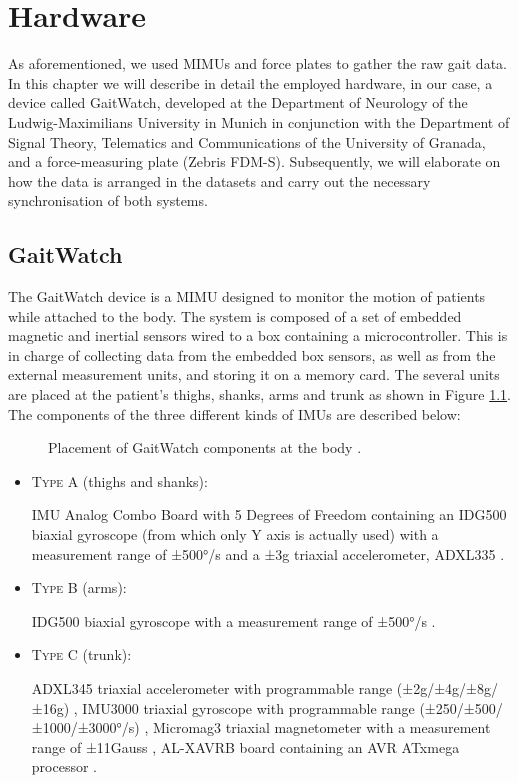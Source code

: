 \chapter{Hardware}
\label{ch:Hardware}

As aforementioned, we used MIMUs and force plates to gather the raw gait data. In this chapter we will describe in detail the employed hardware, in our case, a device called GaitWatch, developed at the Department of Neurology of the Ludwig-Maximilians University in Munich in conjunction with the Department of Signal Theory, Telematics and Communications of the University of Granada, and a force-measuring plate (Zebris FDM-S). Subsequently, we will elaborate on how the data is arranged in the datasets and carry out the necessary synchronisation of both systems.

\section{GaitWatch}

The GaitWatch device is a MIMU designed to monitor the motion of patients while attached to the body. The system is composed of a set of embedded magnetic and inertial sensors wired to a box containing a microcontroller. This is in charge of collecting data from the embedded box sensors, as well as from the external measurement units, and storing it on a memory card. The several units are placed at the patient's thighs, shanks, arms and trunk as shown in Figure \ref{fig:GaitWatch_placement}. The components of the three different kinds of IMUs are described below:

\begin{figure}
	\centering
	\caption{Placement of GaitWatch components at the body \cite{olivares_vicente_gaitwatch_2013}.}
	\label{fig:GaitWatch_placement}
\end{figure}

\begin{itemize}

\item \textsc{Type A} (thighs and shanks): 

IMU Analog Combo Board with 5 Degrees of Freedom \cite{IMU5} containing an IDG500 biaxial gyroscope (from which only Y axis is actually used) with a measurement range of ±500°/s \cite{IDG500} and a ±3g triaxial accelerometer, ADXL335 \cite{ADXL335}.

\item \textsc{Type B} (arms):

IDG500 biaxial gyroscope with a measurement range of ±500°/s \cite{IDG500}.

\item \textsc{Type C} (trunk):

ADXL345 triaxial accelerometer with programmable range (±2g/±4g/±8g/±16g) \cite{ADXL345},
IMU3000 triaxial gyroscope with programmable range (±250/±500/±1000/±3000°/s) \cite{IMU3000}, 
Micromag3 triaxial magnetometer with a measurement range of ±11Gauss \cite{MicroMag3}, AL-XAVRB board containing an AVR ATxmega processor \cite{AVRATxmega}.

\end{itemize}


